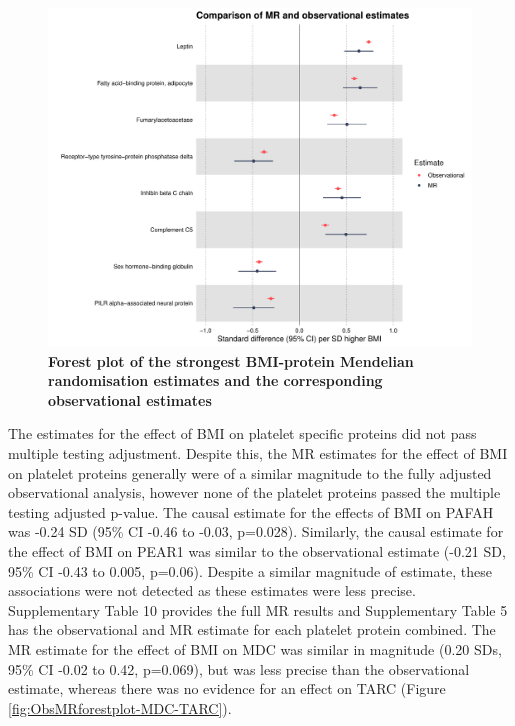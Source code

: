 \documentclass[11pt,twoside]{bristolthesis}
\begin{document}
\begin{figure}

{\centering \includegraphics[width=0.9\linewidth]{figure/BMI_protein_INTERVAL/MR_obs_compar_forestplot} 

}

\caption[Forest plot of the strongest BMI-protein Mendelian randomisation estimates and the corresponding observational estimates]{\textbf{Forest plot of the strongest BMI-protein Mendelian randomisation estimates and the corresponding observational estimates}}\label{fig:ObsMRforestplot2}
\end{figure}
The estimates for the effect of BMI on platelet specific proteins did not pass multiple testing adjustment. Despite this, the MR estimates for the effect of BMI on platelet proteins generally were of a similar magnitude to the fully adjusted observational analysis, however none of the platelet proteins passed the multiple testing adjusted p-value. The causal estimate for the effects of BMI on PAFAH was -0.24 SD (95\% CI -0.46 to -0.03, p=0.028). Similarly, the causal estimate for the effect of BMI on PEAR1 was similar to the observational estimate (-0.21 SD, 95\% CI -0.43 to 0.005, p=0.06). Despite a similar magnitude of estimate, these associations were not detected as these estimates were less precise. Supplementary Table 10 provides the full MR results and Supplementary Table 5 has the observational and MR estimate for each platelet protein combined. The MR estimate for the effect of BMI on MDC was similar in magnitude (0.20 SDs, 95\% CI -0.02 to 0.42, p=0.069), but was less precise than the observational estimate, whereas there was no evidence for an effect on TARC (Figure \ref{fig:ObsMRforestplot-MDC-TARC}).
\end{document}
